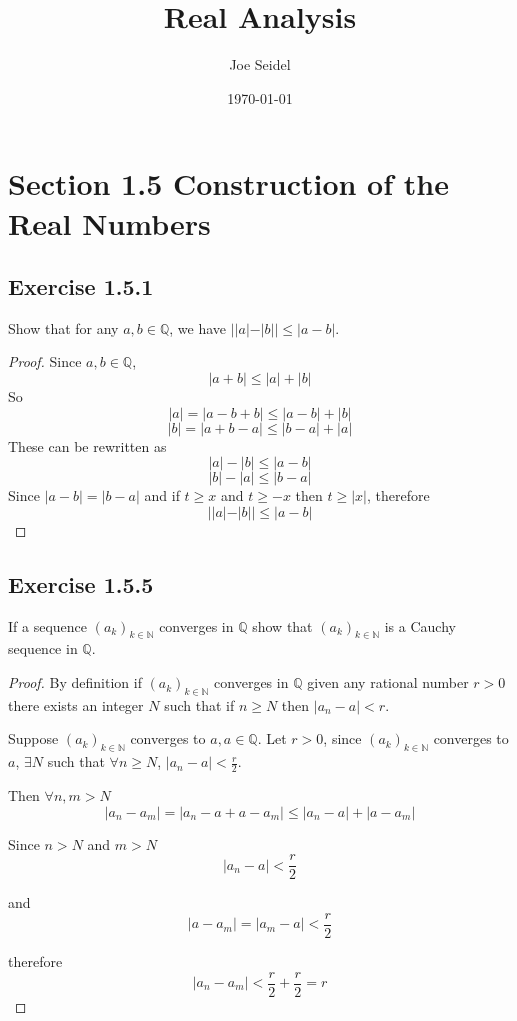 \documentclass{tufte-book}
\title{Real Analysis}
\author{Joe Seidel}
\date{\today}
\theoremstyle{mytheoremstyle}
\theoremstyle{mylemstyle}
\theoremstyle{mydefstyle}
\begin{document}
\maketitle
{}
\newpage
{}

\section{Section 1.5 Construction of the Real Numbers}

\subsection{Exercise 1.5.1} 

Show that for any $a, b \in \mathbb{Q}$, we have $||a|-|b|| \leq |a-b|$.

\begin{proof} Since $a,b \in \mathbb{Q}$, 
\[|a+b| \leq |a|+|b|\]
So
\[|a|=|a-b+b| \leq |a-b| + |b|\]
\[|b|=|a+b-a| \leq |b-a| + |a|\]
These can be rewritten as 
\[|a|-|b| \leq |a-b|\]
\[|b|-|a| \leq |b-a|\]
Since $|a-b|=|b-a|$ and if $t \geq x$ and $t \geq -x$ then $t \geq |x|$, therefore 
\[||a|-|b|| \leq |a-b| \]\end{proof}

\subsection{Exercise 1.5.5}
If a sequence $(a_k)_{k \in \mathbb{N}}$ converges in $\mathbb{Q}$ show that 
$(a_k)_{k \in \mathbb{N}}$ is a Cauchy sequence in $\mathbb{Q}$.

\begin{proof}By definition if $(a_k)_{k \in \mathbb{N}}$ converges in $\mathbb{Q}$ given any rational number $r > 0$ there exists an integer $N$ such that if $n \geq N$ then $|a_n-a|<r$. 

Suppose $(a_k)_{k \in \mathbb{N}}$ converges to $a, a \in \mathbb{Q}$. Let $r>0$, since $(a_k)_{k \in \mathbb{N}}$ converges to $a$,  $\exists N$ such that $\forall n \geq N$, $|a_n-a| < \frac{r}{2}$.

Then $\forall n,m > N$
\[|a_n-a_m| = |a_n-a+a-a_m| \leq |a_n-a| + |a-a_m|\]

Since $n > N$ and $m > N$
\[|a_n-a| < \frac{r}{2}\]

and
\[|a-a_m| = |a_m-a| < \frac{r}{2}\]

therefore
\[|a_n-a_m|< \frac{r}{2} + \frac{r}{2} = r\]
\end{proof}
\end{document}
